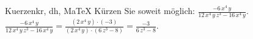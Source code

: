 \begin{MAufgabe}{Kuerzen}{kr, dh, MaTeX}
K\"urzen Sie soweit m\"oglich: $\frac{- 6\, x^4\, y}{12\, x^4\, y\, z^3 - 16\, x^4\, y}$.\\ 
\ifLsg\MLoesung
\quad $\frac{- 6\, x^4\, y}{12\, x^4\, y\, z^3 - 16\, x^4\, y}=\frac{(2\, x^4\, y)\cdot(-3)}{(2\, x^4\, y)\cdot(6\, z^3 - 8)}=\frac{-3}{6\, z^3 - 8}$.\else\relax\fi
 \end{MAufgabe}